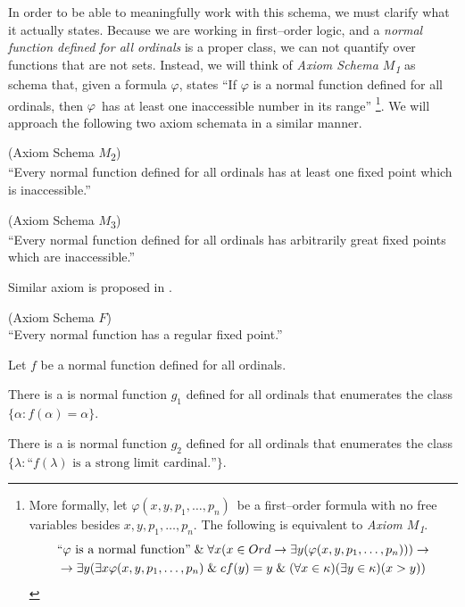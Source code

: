In order to be able to meaningfully work with this schema, we must clarify what it actually states. 
Because we are working in first–order logic, and a \emph{normal function defined for all ordinals} is a proper class, we can not quantify over functions that are not sets. 
Instead, we will think of \emph{Axiom Schema $M$\textsubscript{1}} as schema that, given a formula $\varphi$, states %
``If $\varphi$ is a normal function defined for all ordinals, then $\varphi$ has at least one inaccessible number in its range''%
\footnote{More formally, let $\varphi(x, y, p_1, \ldots, p_n)$ be a first–order formula with no free variables besides $x, y, p_1, \ldots, p_n$. The following is equivalent to \emph{Axiom $M$\textsubscript{1}}.
\begin{equation}
\begin{gathered}
\mbox{``$\varphi$ is a normal function''} \et \forall x (x \in Ord \then \exists y(\varphi(x, y, p_1, \ldots, p_n))) \then\\
\then \exists y (\exists x \varphi(x, y, p_1, \ldots, p_n) \et cf(y) = y \et (\forall x \in \kappa)(\exists y \in \kappa)(x > y))
\end{gathered}
\end{equation}}.
We will approach the following two axiom schemata in a similar manner.

\begin{definition}{(Axiom Schema $M$\textsubscript{2})}\\
``Every normal function defined for all ordinals has at least one fixed point which is inaccessible.''
\end{definition}

\begin{definition}{(Axiom Schema $M$\textsubscript{3})}\\
``Every normal function defined for all ordinals has arbitrarily great fixed points which are inaccessible.''
\end{definition}

Similar axiom is proposed in \cite{DrakeBook}.
\begin{definition}{(Axiom Schema $F$)}\label{def:axiom_f}\\
``Every normal function has a regular fixed point.''
\end{definition}

\begin{lemma}\label{lemma:limit_fixed_normal_function}
Let $f$ be a normal function defined for all ordinals.
\bce[(i)]
\item There is a is normal function $g_1$ defined for all ordinals that enumerates the class $\{\alpha : f(\alpha) = \alpha \}$.
\item There is a is normal function $g_2$ defined for all ordinals that enumerates the class $\{ \lambda : \mbox{``$f(\lambda)$ is a strong limit cardinal.''}\}$. 
\ece
\end{lemma}

